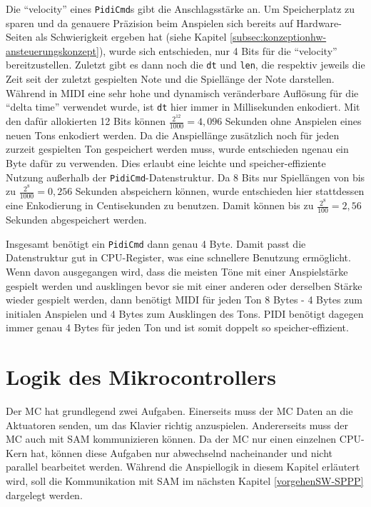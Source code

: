 Die \enquote{velocity} eines \lstinline{PidiCmd}s gibt die Anschlagsstärke an.
Um Speicherplatz zu sparen und da genauere Präzision beim Anspielen sich bereits auf Hardware-Seiten als Schwierigkeit ergeben hat (siehe Kapitel \ref{subsec:konzeptionhw-ansteuerungskonzept}), wurde sich entschieden, nur 4 Bits für die \enquote{velocity} bereitzustellen.
Zuletzt gibt es dann noch die \lstinline{dt} und \lstinline{len}, die respektiv jeweils die Zeit seit der zuletzt gespielten Note und die Spiellänge der Note darstellen. \newline
Während in \ac{MIDI} eine sehr hohe und dynamisch veränderbare Auflösung für die \enquote{delta time} verwendet wurde, ist \lstinline{dt} hier immer in Millisekunden enkodiert.
Mit den dafür allokierten 12 Bits können $\frac{2^{12}}{1000} = 4,096$ Sekunden ohne Anspielen eines neuen Tons enkodiert werden. \newline
Da die Anspiellänge zusätzlich noch für jeden zurzeit gespielten Ton gespeichert werden muss, wurde entschieden ngenau ein Byte dafür zu verwenden.
Dies erlaubt eine leichte und speicher-effiziente Nutzung außerhalb der \lstinline{PidiCmd}-Datenstruktur.
Da 8 Bits nur Spiellängen von bis zu $\frac{2^8}{1000} = 0,256$ Sekunden abspeichern können, wurde entschieden hier stattdessen eine Enkodierung in Centisekunden zu benutzen.
Damit können bis zu $\frac{2^8}{100} = 2,56$ Sekunden abgespeichert werden.

Insgesamt benötigt ein \lstinline{PidiCmd} dann genau 4 Byte.
Damit passt die Datenstruktur gut in CPU-Register, was eine schnellere Benutzung ermöglicht.
Wenn davon ausgegangen wird, dass die meisten Töne mit einer Anspielstärke gespielt werden und ausklingen bevor sie mit einer anderen oder derselben Stärke wieder gespielt werden, dann benötigt \ac{MIDI} für jeden Ton 8 Bytes - 4 Bytes zum initialen Anspielen und 4 Bytes zum Ausklingen des Tons.
\ac{PIDI} benötigt dagegen immer genau 4 Bytes für jeden Ton und ist somit doppelt so speicher-effizient.


\section{Logik des Mikrocontrollers} \label{vorgehenSW-MC}

Der \ac{MC} hat grundlegend zwei Aufgaben.
Einerseits muss der \ac{MC} Daten an die Aktuatoren senden, um das Klavier richtig anzuspielen.
Andererseits muss der \ac{MC} auch mit \ac{SAM} kommunizieren können.
Da der \ac{MC} nur einen einzelnen CPU-Kern hat, können diese Aufgaben nur abwechselnd nacheinander und nicht parallel bearbeitet werden.
Während die Anspiellogik in diesem Kapitel erläutert wird, soll die Kommunikation mit \ac{SAM} im nächsten Kapitel \ref{vorgehenSW-SPPP} dargelegt werden.

